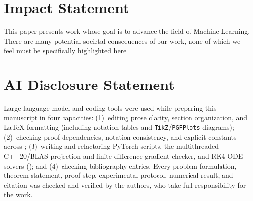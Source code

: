 \documentclass{article}
\theoremstyle{plain}
\theoremstyle{definition}
\theoremstyle{remark}
\begin{document}
\printAffiliationsAndNotice{}



\clearpage
\setcounter{topnumber}{3}
\setcounter{dbltopnumber}{2}
\raggedbottom
\section*{Impact Statement}
This paper presents work whose goal is to advance the field of Machine Learning. There are many potential societal
consequences of our work, none of which we feel must be specifically highlighted here.

\section*{AI Disclosure Statement}
Large language model and coding tools were used while preparing this manuscript in four capacities: (1)~editing prose clarity, section organization, and LaTeX formatting (including notation tables and \texttt{TikZ}/\texttt{PGFPlots} diagrams); (2)~checking proof dependencies, notation consistency, and explicit constants across ; (3)~writing and refactoring PyTorch scripts, the multithreaded C++20/BLAS projection and finite-difference gradient checker, and RK4 ODE solvers (); and (4)~checking bibliography entries. Every problem formulation, theorem statement, proof step, experimental protocol, numerical result, and citation was checked and verified by the authors, who take full responsibility for the work.



\end{document}
